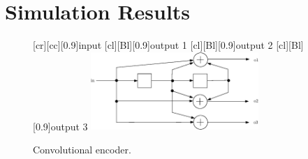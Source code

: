 \documentclass[conference]{IEEEtran}
\begin{document}
\section{Simulation Results}
\label{sec:sr}

\begin{figure}
  \centering
    [cr][cc][0.9]{input}
    [cl][Bl][0.9]{output 1}
    [cl][Bl][0.9]{output 2}
    [cl][Bl][0.9]{output 3}
    \includegraphics[width=2.5in]{conv_enc.eps}
   \caption{Convolutional encoder. \label{fig:conv_enc} }
\end{figure}
\end{document}
